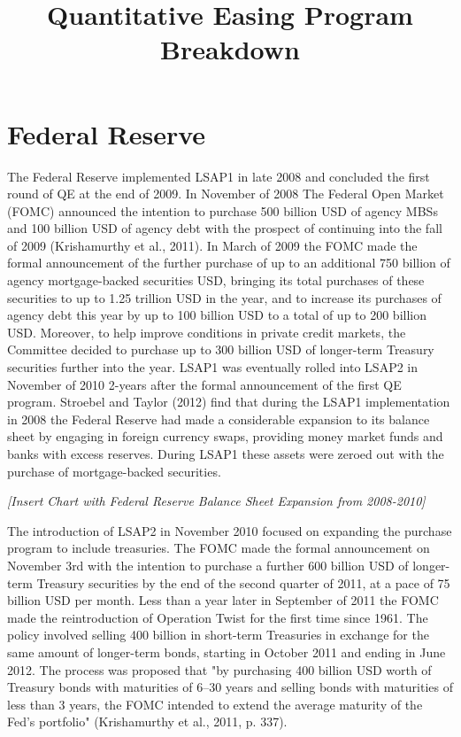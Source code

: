 \title{Quantitative Easing Program Breakdown}
\section{Federal Reserve}

The Federal Reserve implemented LSAP1 in late 2008 and concluded the first round of QE at the end of 2009. In November of 2008 The Federal Open Market  (FOMC) announced the intention to purchase 500 billion USD of agency MBSs and 100 billion USD of agency debt with the prospect of continuing into the fall of 2009 (Krishamurthy et al., 2011). In March of 2009 the FOMC made the formal announcement of the further purchase of up to an additional 750 billion of agency mortgage-backed securities USD, bringing its total purchases of these securities to up to 1.25 trillion USD in the year, and to increase its purchases of agency debt this year by up to 100 billion USD to a total of up to 200 billion USD.  Moreover, to help improve conditions in private credit markets, the Committee decided to purchase up to 300 billion USD of longer-term Treasury securities further into the year. LSAP1 was eventually rolled into LSAP2 in November of 2010 2-years after the formal announcement of the first QE program. Stroebel and Taylor (2012) find that during the LSAP1 implementation in 2008 the Federal Reserve had made a considerable expansion to its balance sheet by engaging in foreign currency swaps, providing money market funds and banks with excess reserves. During LSAP1 these assets were zeroed out with the purchase of mortgage-backed securities.

\textit{[Insert Chart with Federal Reserve Balance Sheet Expansion from 2008-2010]}

The introduction of LSAP2 in November 2010 focused on expanding the purchase program to include treasuries. The FOMC made the formal announcement on November 3rd with the intention to purchase a further 600 billion USD of longer-term Treasury securities by the end of the second quarter of 2011, at a pace of 75 billion USD per month. Less than a year later in September of 2011 the FOMC made the reintroduction of Operation Twist for the first time since 1961. The policy involved selling 400 billion in short-term Treasuries in exchange for the same amount of longer-term bonds, starting in October 2011 and ending in June 2012. The process was proposed that "by purchasing 400 billion USD worth of Treasury bonds with maturities of 6–30 years and selling bonds with maturities of less than 3 years, the FOMC intended to extend the average maturity of the Fed’s portfolio" (Krishamurthy et al., 2011, p. 337).

